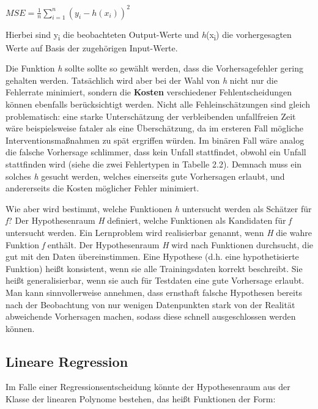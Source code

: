 $MSE=\displaystyle \frac{1}{n} \displaystyle \sum_{i=1}^{n} (y_i - h(x_i))^2$

\vspace{0.3cm}

Hierbei sind y\textsubscript{i} die beobachteten Output-Werte und
\emph{h}(x\textsubscript{i}) die vorhergesagten Werte auf Basis der zugehörigen
Input-Werte.

Die Funktion \emph{h} sollte sollte so gewählt werden, dass die Vorhersagefehler
gering gehalten werden. Tatsächlich wird aber bei der Wahl von \emph{h} nicht nur die
Fehlerrate minimiert, sondern die \textbf{Kosten} verschiedener Fehlentscheidungen
können ebenfalls berücksichtigt werden. Nicht alle Fehleinschätzungen sind gleich
problematisch: eine starke Unterschätzung der verbleibenden unfallfreien Zeit wäre
beispielsweise fataler als eine Überschätzung, da im ersteren Fall mögliche
Interventionsmaßnahmen zu spät ergriffen würden. Im binären Fall wäre analog die
falsche Vorhersage schlimmer, dass kein Unfall stattfindet, obwohl ein Unfall
stattfinden wird (siehe die zwei Fehlertypen in Tabelle 2.2). Demnach muss ein
solches \emph{h} gesucht werden, welches einerseits gute Vorhersagen erlaubt, und
andererseits die Kosten möglicher Fehler minimiert.

Wie aber wird bestimmt, welche Funktionen \emph{h} untersucht werden als Schätzer für
\emph{f}? Der Hypothesenraum \emph{H} definiert, welche Funktionen als Kandidaten für
\emph{f} untersucht werden. Ein Lernproblem wird realisierbar genannt, wenn \emph{H}
die wahre Funktion \emph{f} enthält. Der Hypothesenraum \emph{H} wird nach Funktionen
durchsucht, die gut mit den Daten übereinstimmen. Eine Hypothese (d.h. eine
hypothetisierte Funktion) heißt konsistent, wenn sie alle Trainingsdaten korrekt
beschreibt. Sie heißt generalisierbar, wenn sie auch für Testdaten eine gute
Vorhersage erlaubt. Man kann sinnvollerweise annehmen, dass ernsthaft falsche
Hypothesen bereits nach der Beobachtung von nur wenigen Datenpunkten stark von der
Realität abweichende Vorhersagen machen, sodass diese schnell ausgeschlossen werden
können.

\subsection{Lineare Regression}

Im Falle einer Regressionsentscheidung könnte der Hypothesenraum aus der Klasse der
linearen Polynome bestehen, das heißt Funktionen der Form:

